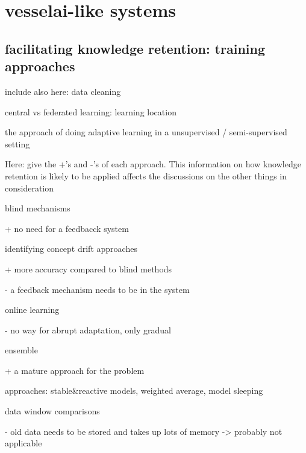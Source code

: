 


\chapter{vesselai-like systems}

\section{facilitating knowledge retention: training approaches}

include also here: data cleaning

central vs federated learning: learning location

the approach of doing adaptive learning in a unsupervised / semi-supervised setting

Here: give the +'s and -'s of each approach. This information on how knowledge retention is likely to be applied affects the discussions on the other things in consideration

blind mechanisms

+ no need for a feedbacck system

identifying concept drift approaches

+ more accuracy compared to blind methods \cite{conceptdriftsurvey}

- a feedback mechanism needs to be in the system

online learning

- no way for abrupt adaptation, only gradual \cite{conceptdriftsurvey}

ensemble

+ a mature approach for the problem \cite{mlforstreamingsurvey}

approaches: stable&reactive models, weighted average, model sleeping \cite{conceptdriftsurvey}

data window comparisons

- old data needs to be stored and takes up lots of memory \cite{conceptdriftsurvey} -> probably not applicable

